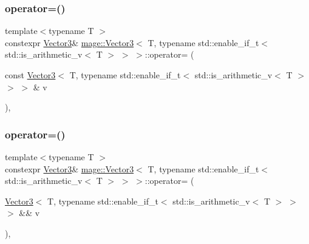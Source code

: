 \subsubsection{\texorpdfstring{operator=()}{operator=()}\hspace{0.1cm}{\footnotesize\ttfamily [1/2]}}
{\footnotesize\ttfamily template$<$typename T $>$ \\
constexpr \hyperlink{structmage_1_1_vector3}{Vector3}\& \hyperlink{structmage_1_1_vector3}{mage\+::\+Vector3}$<$ T, typename std\+::enable\+\_\+if\+\_\+t$<$ std\+::is\+\_\+arithmetic\+\_\+v$<$ T $>$ $>$ $>$\+::operator= (\begin{DoxyParamCaption}\item[{const \hyperlink{structmage_1_1_vector3}{Vector3}$<$ T, typename std\+::enable\+\_\+if\+\_\+t$<$ std\+::is\+\_\+arithmetic\+\_\+v$<$ T $>$ $>$ $>$ \&}]{v }\end{DoxyParamCaption})\hspace{0.3cm}{\ttfamily [default]}, {\ttfamily [noexcept]}}

\hypertarget{structmage_1_1_vector3_3_01_t_00_01typename_01std_1_1enable__if__t_3_01std_1_1is__arithmetic__v_3_01_t_01_4_01_4_01_4_af2a5b8588dfe9f20183feede49ee2f54}{}\label{structmage_1_1_vector3_3_01_t_00_01typename_01std_1_1enable__if__t_3_01std_1_1is__arithmetic__v_3_01_t_01_4_01_4_01_4_af2a5b8588dfe9f20183feede49ee2f54} 
\subsubsection{\texorpdfstring{operator=()}{operator=()}\hspace{0.1cm}{\footnotesize\ttfamily [2/2]}}
{\footnotesize\ttfamily template$<$typename T $>$ \\
constexpr \hyperlink{structmage_1_1_vector3}{Vector3}\& \hyperlink{structmage_1_1_vector3}{mage\+::\+Vector3}$<$ T, typename std\+::enable\+\_\+if\+\_\+t$<$ std\+::is\+\_\+arithmetic\+\_\+v$<$ T $>$ $>$ $>$\+::operator= (\begin{DoxyParamCaption}\item[{\hyperlink{structmage_1_1_vector3}{Vector3}$<$ T, typename std\+::enable\+\_\+if\+\_\+t$<$ std\+::is\+\_\+arithmetic\+\_\+v$<$ T $>$ $>$ $>$ \&\&}]{v }\end{DoxyParamCaption})\hspace{0.3cm}{\ttfamily [default]}, {\ttfamily [noexcept]}}

